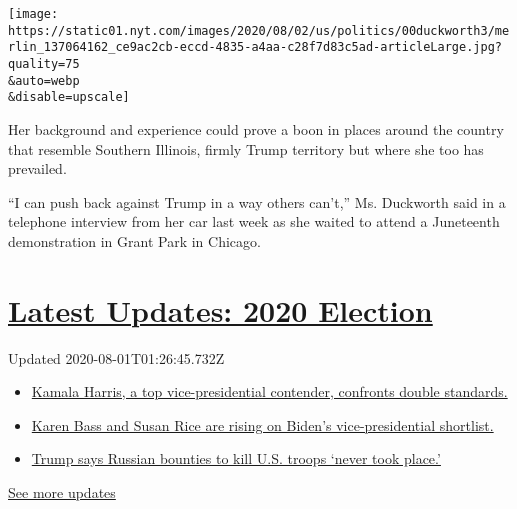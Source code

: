 \texttt{[image: https://static01.nyt.com/images/2020/08/02/us/politics/00duckworth3/merlin\_137064162\_ce9ac2cb-eccd-4835-a4aa-c28f7d83c5ad-articleLarge.jpg?quality=75\\\&auto=webp\\\&disable=upscale]}

Her background and experience could prove a boon in places around the
country that resemble Southern Illinois, firmly Trump territory but
where she too has prevailed.

``I can push back against Trump in a way others can't,'' Ms. Duckworth
said in a telephone interview from her car last week as she waited to
attend a Juneteenth demonstration in Grant Park in Chicago.

\hypertarget{latest-updates-2020-election}{%
\section{\texorpdfstring{\href{https://www.nytimes.com/2020/07/31/us/elections/biden-vs-trump.html?action=click\&pgtype=Article\&state=default\&region=MAIN_CONTENT_1\&context=storylines_live_updates}{Latest
Updates: 2020
Election}}{Latest Updates: 2020 Election}}\label{latest-updates-2020-election}}

Updated 2020-08-01T01:26:45.732Z

\begin{itemize}
\tightlist
\item
  \href{https://www.nytimes.com/2020/07/31/us/elections/biden-vs-trump.html?action=click\&pgtype=Article\&state=default\&region=MAIN_CONTENT_1\&context=storylines_live_updates\#link-29fdff45}{Kamala
  Harris, a top vice-presidential contender, confronts double
  standards.}
\item
  \href{https://www.nytimes.com/2020/07/31/us/elections/biden-vs-trump.html?action=click\&pgtype=Article\&state=default\&region=MAIN_CONTENT_1\&context=storylines_live_updates\#link-13ec3d9c}{Karen
  Bass and Susan Rice are rising on Biden's vice-presidential
  shortlist.}
\item
  \href{https://www.nytimes.com/2020/07/31/us/elections/biden-vs-trump.html?action=click\&pgtype=Article\&state=default\&region=MAIN_CONTENT_1\&context=storylines_live_updates\#link-49e9a016}{Trump
  says Russian bounties to kill U.S. troops `never took place.'}
\end{itemize}

\href{https://www.nytimes.com/2020/07/31/us/elections/biden-vs-trump.html?action=click\&pgtype=Article\&state=default\&region=MAIN_CONTENT_1\&context=storylines_live_updates}{See
more updates}

